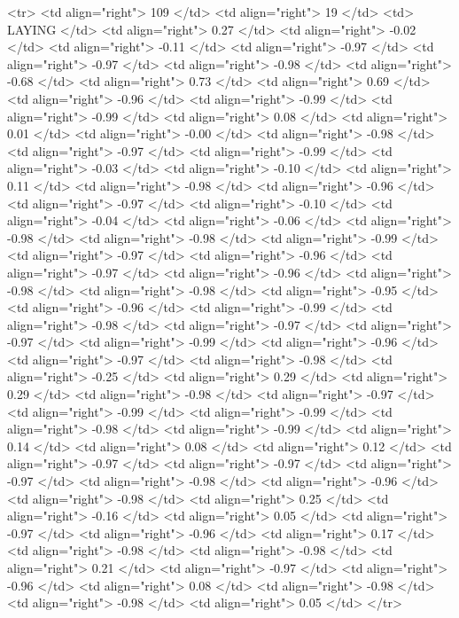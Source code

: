   <tr> <td align="right"> 109 </td> <td align="right">  19 </td> <td> LAYING </td> <td align="right"> 0.27 </td> <td align="right"> -0.02 </td> <td align="right"> -0.11 </td> <td align="right"> -0.97 </td> <td align="right"> -0.97 </td> <td align="right"> -0.98 </td> <td align="right"> -0.68 </td> <td align="right"> 0.73 </td> <td align="right"> 0.69 </td> <td align="right"> -0.96 </td> <td align="right"> -0.99 </td> <td align="right"> -0.99 </td> <td align="right"> 0.08 </td> <td align="right"> 0.01 </td> <td align="right"> -0.00 </td> <td align="right"> -0.98 </td> <td align="right"> -0.97 </td> <td align="right"> -0.99 </td> <td align="right"> -0.03 </td> <td align="right"> -0.10 </td> <td align="right"> 0.11 </td> <td align="right"> -0.98 </td> <td align="right"> -0.96 </td> <td align="right"> -0.97 </td> <td align="right"> -0.10 </td> <td align="right"> -0.04 </td> <td align="right"> -0.06 </td> <td align="right"> -0.98 </td> <td align="right"> -0.98 </td> <td align="right"> -0.99 </td> <td align="right"> -0.97 </td> <td align="right"> -0.96 </td> <td align="right"> -0.97 </td> <td align="right"> -0.96 </td> <td align="right"> -0.98 </td> <td align="right"> -0.98 </td> <td align="right"> -0.95 </td> <td align="right"> -0.96 </td> <td align="right"> -0.99 </td> <td align="right"> -0.98 </td> <td align="right"> -0.97 </td> <td align="right"> -0.97 </td> <td align="right"> -0.99 </td> <td align="right"> -0.96 </td> <td align="right"> -0.97 </td> <td align="right"> -0.98 </td> <td align="right"> -0.25 </td> <td align="right"> 0.29 </td> <td align="right"> 0.29 </td> <td align="right"> -0.98 </td> <td align="right"> -0.97 </td> <td align="right"> -0.99 </td> <td align="right"> -0.99 </td> <td align="right"> -0.98 </td> <td align="right"> -0.99 </td> <td align="right"> 0.14 </td> <td align="right"> 0.08 </td> <td align="right"> 0.12 </td> <td align="right"> -0.97 </td> <td align="right"> -0.97 </td> <td align="right"> -0.97 </td> <td align="right"> -0.98 </td> <td align="right"> -0.96 </td> <td align="right"> -0.98 </td> <td align="right"> 0.25 </td> <td align="right"> -0.16 </td> <td align="right"> 0.05 </td> <td align="right"> -0.97 </td> <td align="right"> -0.96 </td> <td align="right"> 0.17 </td> <td align="right"> -0.98 </td> <td align="right"> -0.98 </td> <td align="right"> 0.21 </td> <td align="right"> -0.97 </td> <td align="right"> -0.96 </td> <td align="right"> 0.08 </td> <td align="right"> -0.98 </td> <td align="right"> -0.98 </td> <td align="right"> 0.05 </td> </tr>
